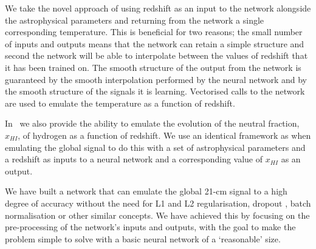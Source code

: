 We take the novel approach of using redshift as an input to the network alongside the astrophysical parameters and returning from the network a single corresponding temperature. This is beneficial for two reasons; the small number of inputs and outputs means that the network can retain a simple structure and second the network will be able to interpolate between the values of redshift that it has been trained on. The smooth structure of the output from the network is guaranteed by the smooth interpolation performed by the neural network and by the smooth structure of the signals it is learning. Vectorised calls to the network are used to emulate the temperature as a function of redshift.

In \name~we also provide the ability to emulate the evolution of the neutral fraction, $x_{HI}$, of hydrogen as a function of redshift. We use an identical framework as when emulating the global signal to do this with a set of astrophysical parameters and a redshift as inputs to a neural network and a corresponding value of $x_{HI}$ as an output.

We have built a network that can emulate the global 21-cm signal to a high degree of accuracy without the need for L1 and L2 regularisation, dropout \citep{Srivastava2014}, batch normalisation \citep{Ioffe2015} or other similar concepts. We have achieved this by focusing on the pre-processing of the network's inputs and outputs, with the goal to make the problem simple to solve with a basic neural network of a `reasonable' size.

